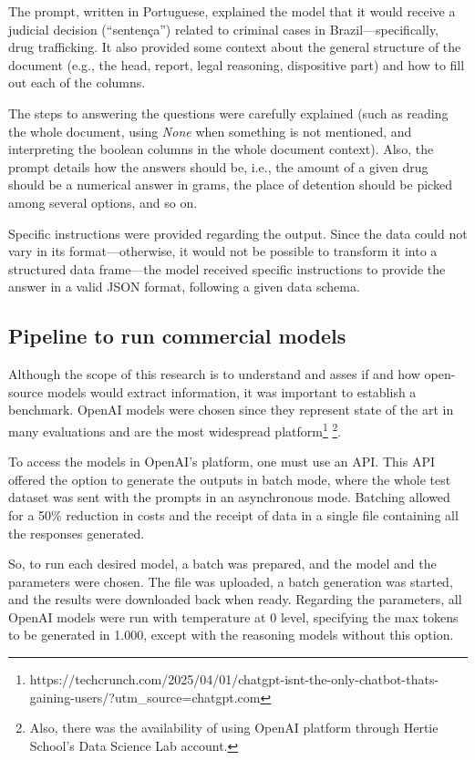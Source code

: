 \documentclass[
  12pt,
]{article}
\begin{document}
The prompt, written in Portuguese, explained the model that it would
receive a judicial decision (``sentença'') related to criminal cases in
Brazil---specifically, drug trafficking. It also provided some context
about the general structure of the document (e.g., the head, report,
legal reasoning, dispositive part) and how to fill out each of the
columns.

The steps to answering the questions were carefully explained (such as
reading the whole document, using \emph{None} when something is not
mentioned, and interpreting the boolean columns in the whole document
context). Also, the prompt details how the answers should be, i.e., the
amount of a given drug should be a numerical answer in grams, the place
of detention should be picked among several options, and so on.

Specific instructions were provided regarding the output. Since the data
could not vary in its format---otherwise, it would not be possible to
transform it into a structured data frame---the model received specific
instructions to provide the answer in a valid JSON format, following a
given data schema.

\subsection{Pipeline to run commercial
models}\label{pipeline-to-run-commercial-models}

Although the scope of this research is to understand and asses if and
how open-source models would extract information, it was important to
establish a benchmark. OpenAI models were chosen since they represent
state of the art in many evaluations and are the most widespread
platform\footnote{https://techcrunch.com/2025/04/01/chatgpt-isnt-the-only-chatbot-thats-gaining-users/?utm\_source=chatgpt.com}
\footnote{Also, there was the availability of using OpenAI platform
  through Hertie School's Data Science Lab account.}.

To access the models in OpenAI's platform, one must use an API. This API
offered the option to generate the outputs in batch mode, where the
whole test dataset was sent with the prompts in an asynchronous mode.
Batching allowed for a 50\% reduction in costs and the receipt of data
in a single file containing all the responses generated.

So, to run each desired model, a batch was prepared, and the model and
the parameters were chosen. The file was uploaded, a batch generation
was started, and the results were downloaded back when ready. Regarding
the parameters, all OpenAI models were run with temperature at 0 level,
specifying the max tokens to be generated in 1.000, except with the
reasoning models without this option.
\end{document}
